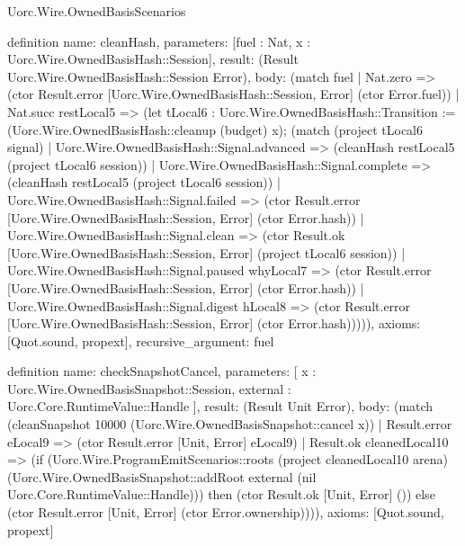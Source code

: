 \begin{lexlean}{Uorc.Wire.OwnedBasisScenarios}
\begin{semanticmodule}
definition{
  name: cleanHash,
  parameters: [fuel : Nat, x : Uorc.Wire.OwnedBasisHash::Session],
  result: (Result Uorc.Wire.OwnedBasisHash::Session Error),
  body: (match fuel
    | Nat.zero => (ctor Result.error [Uorc.Wire.OwnedBasisHash::Session, Error] (ctor Error.fuel))
    | Nat.succ restLocal5 => (let tLocal6 : Uorc.Wire.OwnedBasisHash::Transition := (Uorc.Wire.OwnedBasisHash::cleanup (budget) x); (match (project tLocal6 signal)
      | Uorc.Wire.OwnedBasisHash::Signal.advanced => (cleanHash restLocal5 (project tLocal6 session))
      | Uorc.Wire.OwnedBasisHash::Signal.complete => (cleanHash restLocal5 (project tLocal6 session))
      | Uorc.Wire.OwnedBasisHash::Signal.failed => (ctor Result.error [Uorc.Wire.OwnedBasisHash::Session, Error] (ctor Error.hash))
      | Uorc.Wire.OwnedBasisHash::Signal.clean => (ctor Result.ok [Uorc.Wire.OwnedBasisHash::Session, Error] (project tLocal6 session))
      | Uorc.Wire.OwnedBasisHash::Signal.paused whyLocal7 => (ctor Result.error [Uorc.Wire.OwnedBasisHash::Session, Error] (ctor Error.hash))
      | Uorc.Wire.OwnedBasisHash::Signal.digest hLocal8 => (ctor Result.error [Uorc.Wire.OwnedBasisHash::Session, Error] (ctor Error.hash))))),
  axioms: [Quot.sound, propext],
  recursive_argument: fuel
}

definition{
  name: checkSnapshotCancel,
  parameters: [
    x : Uorc.Wire.OwnedBasisSnapshot::Session,
    external : Uorc.Core.RuntimeValue::Handle
  ],
  result: (Result Unit Error),
  body: (match (cleanSnapshot 10000 (Uorc.Wire.OwnedBasisSnapshot::cancel x))
    | Result.error eLocal9 => (ctor Result.error [Unit, Error] eLocal9)
    | Result.ok cleanedLocal10 => (if (Uorc.Wire.ProgramEmitScenarios::roots (project cleanedLocal10 arena) (Uorc.Wire.OwnedBasisSnapshot::addRoot external (nil Uorc.Core.RuntimeValue::Handle))) then (ctor Result.ok [Unit, Error] ()) else (ctor Result.error [Unit, Error] (ctor Error.ownership)))),
  axioms: [Quot.sound, propext]
}


\end{semanticmodule}
\end{lexlean}

